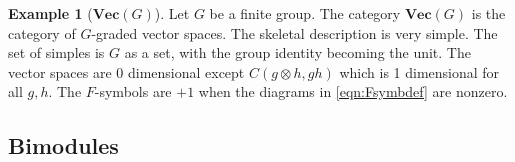 \documentclass[aps,prb,twocolumn,superscriptaddress,noshowkeys]{revtex4-2}  %
\renewcommand{\Vec}{\textbf{Vec}}
\theoremstyle{plain}%
\theoremstyle{definition}
\newtheorem{example}{Example}[section]
\theoremstyle{remark}
\begin{document}
\begin{example}[$\Vec(G)$]\label{example:vecG}
	Let $G$ be a finite group. The category $\Vec(G)$ is the category of $G$-graded vector spaces. The skeletal description is very simple. The set of simples is $G$ as a set, with the group identity becoming the unit. The vector spaces are 0 dimensional except $C(g\otimes h, gh)$ which is 1 dimensional for all $g,h$. The $F$-symbols are $+1$ when the diagrams in \eqref{eqn:Fsymbdef} are nonzero.
\end{example}


\subsection{Bimodules}
\end{document}
